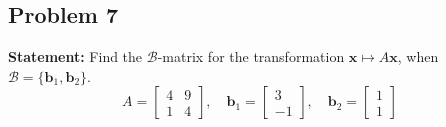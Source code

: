 \documentclass[11pt, a4paper]{article}
\theoremstyle{definition}
\theoremstyle{remark}
\begin{document}
\subsection{Problem 7}
\textbf{Statement:} Find the $\mathcal{B}$-matrix for the transformation $\mathbf{x} \mapsto A\mathbf{x}$, when $\mathcal{B} = \{\mathbf{b}_1, \mathbf{b}_2\}$.
\[
A = \begin{bmatrix} 4 & 9 \\ 1 & 4 \end{bmatrix}, \quad \mathbf{b}_1 = \begin{bmatrix} 3 \\ -1 \end{bmatrix}, \quad \mathbf{b}_2 = \begin{bmatrix} 1 \\ 1 \end{bmatrix}
\]
\end{document}
